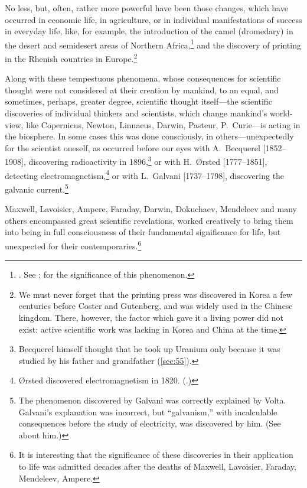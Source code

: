 No less, but, often, rather more powerful have been those changes, which have
occurred in economic life, in agriculture, or in individual manifestations of
success in everyday life, like, for example, the introduction of the camel
(dromedary) in the desert and semidesert areas of Northern Africa,\footnote{%
	\cite[p.~178]{julien1931histoire}.  See
	\cite{gsell1926memoires}; \cite[p.~181]{gautier1927siecles} for the significance of this
	phenomenon.
} and the discovery of printing in the Rhenish countries in Europe.\footnote{%
	We must never forget that the printing press was discovered in Korea a
	few centuries before Coster and Gutenberg, and was widely used in the
	Chinese kingdom.  There, however, the factor which gave it a living
	power did not exist: active scientific work was lacking in Korea and
	China at the time.
}

Along with these tempestuous phenomena, whose consequences for scientific
thought were not considered at their creation by mankind, to an equal, and
sometimes, perhaps, greater degree, scientific thought itself---the scientific
discoveries of individual thinkers and scientists, which change mankind's
world-view, like Copernicus, Newton, Linnaeus, Darwin, Pasteur, P.\ Curie---is
acting in the biosphere.  In some cases this was done consciously, in
others---unexpectedly for the scientist oneself, as occurred before our
eyes with A.\ Becquerel [1852--1908], discovering radioactivity in
1896,\footnote{%
	Becquerel himself thought that he took up Uranium only because it was
	studied by his father and grandfather (\autoref{sec:55}).
} or with H.\ Ørsted [1777--1851], detecting electromagnetism,\footnote{%
	Ørsted discovered electromagnetism in 1820.
	(\cite{oersted1920discovery}.)
} or with L.\ Galvani [1737--1798], discovering the galvanic
current.\footnote{%
	The phenomenon discovered by Galvani was correctly explained by Volta.
	Galvani's explanation was incorrect, but ``galvanism,'' with
	incalculable consequences before the study of electricity, was
	discovered by him.  (See \cite{alibert1801eloge} about him.)
}

Maxwell, Lavoisier, Ampere, Faraday, Darwin, Dokuchaev, Mendeleev and many
others encompassed great scientific revelations, worked creatively to bring
them into being in full consciousness of their fundamental significance for
life, but unexpected for their contemporaries.\footnote{%
	It is interesting that the significance of these discoveries in their
	application to life was admitted decades after the deaths of Maxwell,
	Lavoisier, Faraday, Mendeleev,  Ampere.
}

